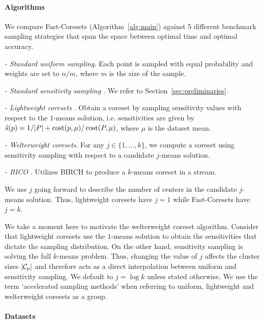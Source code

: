 \paragraph*{Algorithms}
\label{ssec:algorithms}

We compare Fast-Coresets (Algorithm~\ref{alg:main}) against 5 different benchmark sampling strategies that span the space between optimal time and optimal
accuracy.
\begin{description}
        \item \emph{- Standard uniform sampling}. Each point is sampled with equal probability and weights are set to $n / m$, where $m$ is the size of the sample.
        \item \emph{- Standard sensitivity sampling \cite{LS10}}. We refer to Section~\ref{sec:preliminaries}.
        \item \emph{- Lightweight coresets \cite{bachem2018scalable}}. Obtain a coreset by sampling sensitivity values with respect to the $1$-means solution,
            i.e. sensitivities are given by $\hat{s}(p) = 1/|P| + \operatorname{cost}(p, \mu) / \operatorname{cost}(P, \mu)$, where $\mu$ is the dataset mean.
        \item \emph{- Welterweight coresets}. For any $j \in \{1,..., k\}$, we compute a coreset using sensitivity sampling with respect to a candidate
            $j$-means solution.
        \item \emph{- BICO \cite{bico}}. Utilizes BIRCH \cite{birch} to produce a $k$-means coreset in a stream.
\end{description}



We use $j$ going forward to describe the number of centers in the candidate $j$-means solution. Thus, lightweight coresets have $j=1$ while Fast-Coresets have
$j=k$.

We take a moment here to motivate the welterweight coreset algorithm.  Consider that lightweight coresets use the $1$-means solution to obtain the sensitivities
that dictate the sampling distribution. On the other hand, sensitivity sampling is solving the full $k$-means problem. Thus, changing the value of $j$ affects
the cluster sizes $|\mathcal C_p|$ and therefore acts as a direct interpolation between uniform and sensitivity sampling.  We default to $j = \log k$ unless stated
otherwise. We use the term `accelerated sampling methods' when referring to uniform, lightweight and welterweight coresets as a group.

\paragraph*{Datasets}
\label{sssec:datasets}

